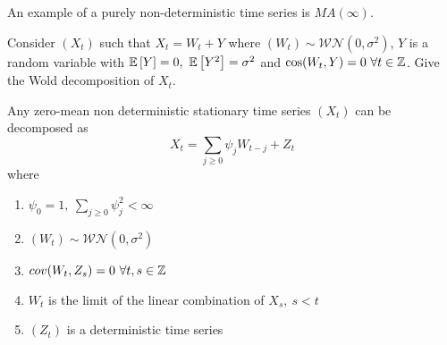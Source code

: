 An example of a purely non-deterministic time series is $MA(\infty)$.

\begin{exercise}
    Consider $(X_t)$ such that $X_t=W_t+Y$ where $(W_t)\sim\mathcal{WN}(0,\sigma^2)$, $Y$ is a random variable with $\expect{Y}=0,\ \expect{Y^2}=\sigma^2$ and $\cos(W_t,Y)=0\ \forall t\in\mathbb{Z}$. Give the Wold decomposition of $X_t$.
\end{exercise}

\begin{theorem}
    \label{theorem_wold}
    Any zero-mean non deterministic stationary time series $(X_t)$ can be decomposed as
    \[
        X_t=\sum_{j\ge0}\psi_jW_{t-j}+Z_t  
    \]
    where
    \begin{enumerate}
        \item $\psi_0=1,\ \sum_{j\ge0}\psi_j^2<\infty$
        \item $(W_t)\sim\mathcal{WN}(0,\sigma^2)$
        \item $cov(W_t,Z_s)=0\ \forall t,s\in\mathbb{Z}$
        \item $W_t$ is the limit of the linear combination of $X_s,\ s<t$
        \item $(Z_t)$ is a deterministic time series
    \end{enumerate}
\end{theorem}

